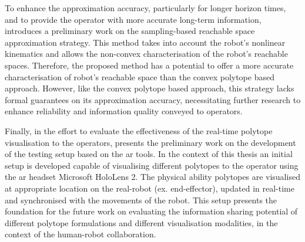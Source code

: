 To enhance the approximation accuracy, particularly for longer horizon times, and to provide the operator with more accurate long-term information,  introduces a preliminary work on the sampling-based reachable space approximation strategy. This method takes into account the robot's nonlinear kinematics and allows the non-convex characterisation of the robot's reachable spaces. Therefore, the proposed method has a potential to offer a more accurate characterisation of robot's reachable space than the convex polytope based approach. However, like the convex polytope based approach, this strategy lacks formal guarantees on its approximation accuracy, necessitating further research to enhance reliability and information quality conveyed to operators. 

Finally, in the effort to evaluate the effectiveness of the real-time polytope visualisation to the operators, 
 presents the preliminary work on the development of the testing setup based on the \gls{ar} tools. In the context of this thesis an initial setup is developed capable of visualising different polytopes to the operator using the \gls{ar} headset Microsoft HoloLens 2. The physical ability polytopes are visualised at appropriate location on the real-robot (ex. end-effector), updated in real-time and synchronised with the movements of the robot. This setup presents the foundation for the future work on evaluating the information sharing potential of different polytope formulations and different visualisation modalities, in the context of the human-robot collaboration.

